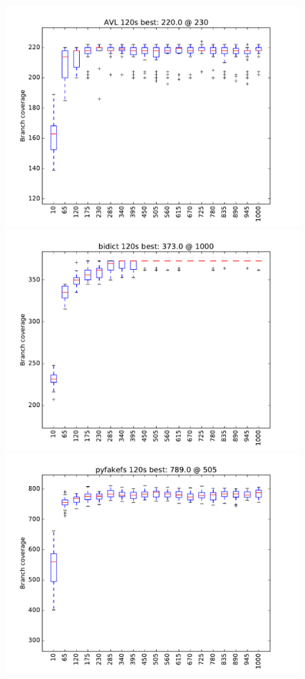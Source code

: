 \documentclass[sigplan]{acmart}
\begin{document}
\begin{figure}
  \includegraphics[width=0.9\columnwidth]{graphs/AVLrand120}
  \includegraphics[width=0.9\columnwidth]{graphs/bidictrand120}
\includegraphics[width=0.9\columnwidth]{graphs/pyfakefsrand120}

\end{figure}
\end{document}
